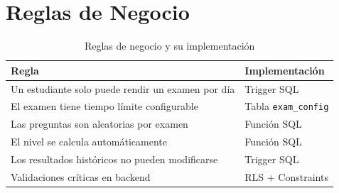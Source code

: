 \section{Reglas de Negocio}

\begin{table}[H]
\centering
\begin{tabularx}{\textwidth}{l Y}
\toprule
\textbf{Regla} & \textbf{Implementación} \\
\midrule
Un estudiante solo puede rendir un examen por día & Trigger SQL \\
El examen tiene tiempo límite configurable & Tabla \texttt{exam\_config} \\
Las preguntas son aleatorias por examen & Función SQL \\
El nivel se calcula automáticamente & Función SQL \\
Los resultados históricos no pueden modificarse & Trigger SQL \\
Validaciones críticas en backend & RLS + Constraints \\
\bottomrule
\end{tabularx}
\caption{Reglas de negocio y su implementación}
\end{table}
